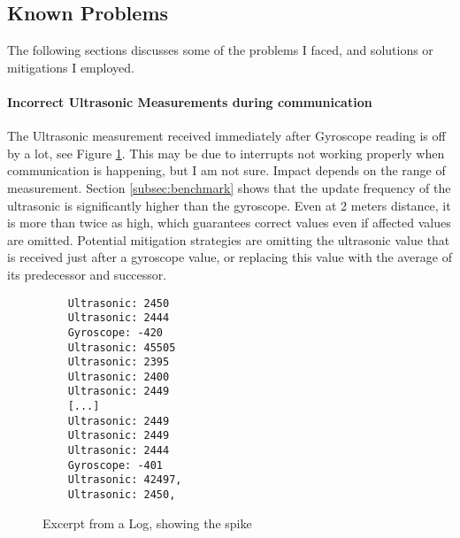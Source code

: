 \subsection{Known Problems}

The following sections discusses some of the problems I faced, and solutions or mitigations I employed.


\paragraph{Incorrect Ultrasonic Measurements during \IIC communication}
The Ultrasonic measurement received immediately after Gyroscope reading is off
by a lot, see Figure \ref{fig:log}.
This may be due to interrupts not working properly when \IIC communication is happening, but I am not sure.
Impact depends on the range of measurement. Section \ref{subsec:benchmark} shows that the update frequency of the ultrasonic is significantly higher than the gyroscope. Even at 2 meters distance, it is more than twice as high, which guarantees correct values even if affected values are omitted.
Potential mitigation strategies are omitting the ultrasonic value that is received just after a gyroscope value, or replacing this value with the average of its predecessor and successor.

\begin{figure}


    \begin{minipage}{\textwidth}
        \begin{verbatim}
    Ultrasonic: 2450
    Ultrasonic: 2444
    Gyroscope: -420
    Ultrasonic: 45505
    Ultrasonic: 2395
    Ultrasonic: 2400
    Ultrasonic: 2449
    [...]
    Ultrasonic: 2449
    Ultrasonic: 2449
    Ultrasonic: 2444
    Gyroscope: -401
    Ultrasonic: 42497, 
    Ultrasonic: 2450, 
\end{verbatim}
    \end{minipage}
    \caption{Excerpt from a Log, showing the spike}
    \label{fig:log}
\end{figure}

